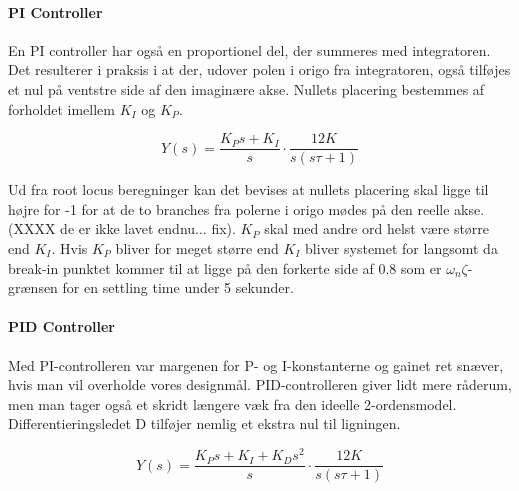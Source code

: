\paragraph{PI Controller}

En PI controller har også en proportionel del, der summeres med integratoren. Det resulterer i praksis i at der, udover polen i origo fra integratoren, også tilføjes et nul på ventstre side af den imaginære akse. Nullets placering bestemmes af forholdet imellem $K_{I}$ og $K_{P}$.

\begin{equation}\label{PI_OpenLoop}
Y(s)=\frac{K_{P}s+K_{I}}{s}\cdot\frac{12K}{s(s\tau+1)}
\end{equation}

Ud fra root locus beregninger kan det bevises at nullets placering skal ligge til højre for -1 for at de to branches fra polerne i origo mødes på den reelle akse. (XXXX de er ikke lavet endnu... fix). $K_{P}$ skal med andre ord helst være større end $K_{I}$. Hvis $K_{P}$ bliver for meget større end $K_{I}$ bliver systemet for langsomt da break-in punktet kommer til at ligge på den forkerte side af 0.8 som er $\omega_{n}\zeta$-grænsen for en settling time under 5 sekunder. 

\paragraph{PID Controller}

Med PI-controlleren var margenen for P- og I-konstanterne og gainet ret snæver, hvis man vil overholde vores designmål. PID-controlleren giver lidt mere råderum, men man tager også et skridt længere væk fra den ideelle 2-ordensmodel. Differentieringsledet D tilføjer nemlig et ekstra nul til ligningen. 

\begin{equation}\label{PID_OpenLoop}
Y(s)=\frac{K_{P}s+K_{I}+K_{D}s^2}{s}\cdot\frac{12K}{s(s\tau+1)}
\end{equation}